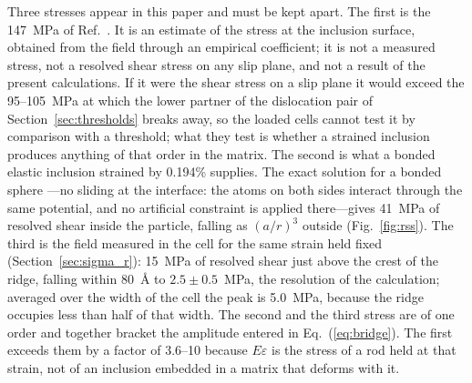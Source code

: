 Three stresses appear in this paper and must be kept apart. The first is the
147~MPa of Ref.~\cite{Friha2024JMMM}. It is an estimate of the stress at the
inclusion surface, obtained from the field through an empirical coefficient;
it is not a measured stress, not a resolved shear stress on any slip plane,
and not a result of the present calculations. If it were the shear stress on
a slip plane it would exceed the 95--105~MPa at which the lower
partner of the dislocation pair of Section~\ref{sec:thresholds} breaks away,
so the loaded cells cannot test it by comparison with a threshold; what they
test is whether a strained inclusion produces anything of that order in the
matrix. The second is what
a bonded elastic inclusion strained by 0.194\% supplies. The exact solution
for a bonded sphere \cite{Eshelby1957}---no sliding at the interface: the
atoms on both sides interact through the same potential, and no artificial
constraint is applied there---gives 41~MPa of resolved shear inside the particle,
falling as $(a/r)^{3}$ outside (Fig.~\ref{fig:rss}). The third is the field
measured in the cell for the same strain held fixed
(Section~\ref{sec:sigma_r}): 15~MPa of resolved shear just above
the crest of the ridge, falling within 80~\AA{} to $2.5\pm0.5$~MPa, the resolution of the
calculation; averaged over the width of the cell the peak is
5.0~MPa, because the ridge occupies less than half of that
width. The second and the third stress are of one order and together
bracket the amplitude entered in Eq.~(\ref{eq:bridge}). The first exceeds
them by a factor of 3.6--10 because $E\varepsilon$ is the stress of a rod held
at that strain, not of an inclusion embedded in a matrix that deforms with
it.

